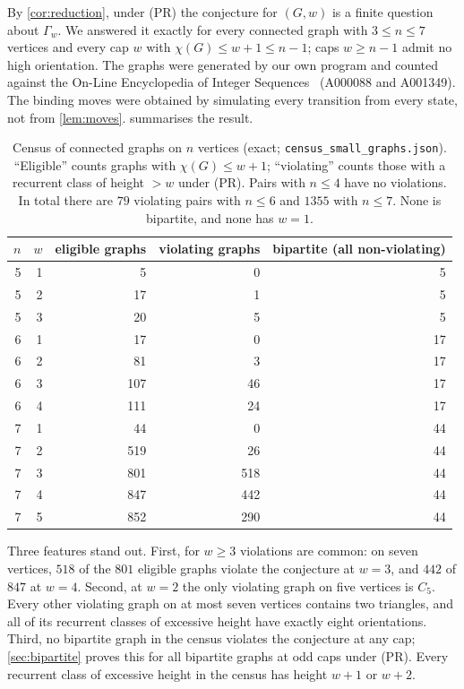\documentclass[11pt,a4paper]{article}
\theoremstyle{plain}
\theoremstyle{plain}
\newcommand{\G}{\Gamma}
\begin{document}
By \cref{cor:reduction}, under (PR) the conjecture for $(G,w)$ is a finite question about $\G_w$. We answered it exactly for every connected graph with $3\le n\le7$ vertices and every cap $w$ with $\chi(G)\le w+1\le n-1$; caps $w\ge n-1$ admit no high orientation. The graphs were generated by our own program and counted against the On-Line Encyclopedia of Integer Sequences~\cite{OEIS} (A000088 and A001349). The binding moves were obtained by simulating every transition from every state, not from \cref{lem:moves}.  summarises the result.

\begin{table}[t]
\centering\small
\caption{Census of connected graphs on $n$ vertices (exact; \texttt{census\_small\_graphs.json}). ``Eligible'' counts graphs with $\chi(G)\le w+1$; ``violating'' counts those with a recurrent class of height $>w$ under (PR). Pairs with $n\le4$ have no violations. In total there are $79$ violating pairs with $n\le6$ and $1355$ with $n\le7$. None is bipartite, and none has $w=1$.}
\label{tab:census}
\begin{tabular}{rrrrr}
\toprule
$n$ & $w$ & eligible graphs & violating graphs & bipartite (all non-violating)\\
\midrule
5 & 1 & 5 & 0 & 5\\
5 & 2 & 17 & 1 & 5\\
5 & 3 & 20 & 5 & 5\\
6 & 1 & 17 & 0 & 17\\
6 & 2 & 81 & 3 & 17\\
6 & 3 & 107 & 46 & 17\\
6 & 4 & 111 & 24 & 17\\
7 & 1 & 44 & 0 & 44\\
7 & 2 & 519 & 26 & 44\\
7 & 3 & 801 & 518 & 44\\
7 & 4 & 847 & 442 & 44\\
7 & 5 & 852 & 290 & 44\\
\bottomrule
\end{tabular}
\end{table}

Three features stand out. First, for $w\ge3$ violations are common: on seven vertices, $518$ of the $801$ eligible graphs violate the conjecture at $w=3$, and $442$ of $847$ at $w=4$. Second, at $w=2$ the only violating graph on five vertices is $C_5$. Every other violating graph on at most seven vertices contains two triangles, and all of its recurrent classes of excessive height have exactly eight orientations. Third, no bipartite graph in the census violates the conjecture at any cap; \cref{sec:bipartite} proves this for all bipartite graphs at odd caps under (PR). Every recurrent class of excessive height in the census has height $w+1$ or $w+2$.
\end{document}
